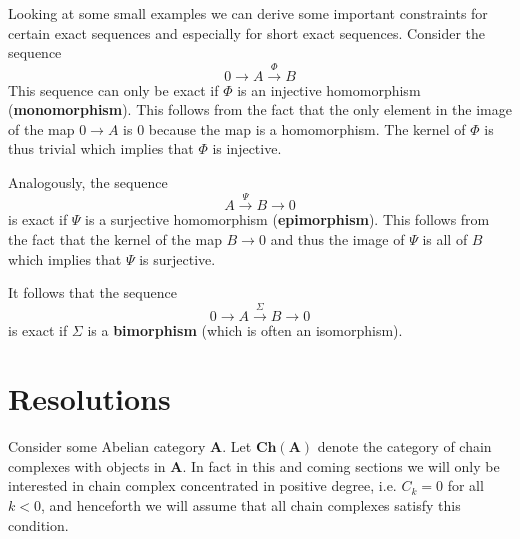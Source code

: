 	
	\begin{property}
		Looking at some small examples we can derive some important constraints for certain exact sequences and especially for short exact sequences. Consider the sequence
		\[
			0\rightarrow A\xrightarrow{\Phi} B
		\]
		This sequence can only be exact if $\Phi$ is an injective homomorphism (\textbf{monomorphism}). This follows from the fact that the only element in the image of the map $0\rightarrow A$ is 0 because the map is a homomorphism. The kernel of $\Phi$ is thus trivial which implies that $\Phi$ is injective.
		
		Analogously, the sequence
		\[
			A\xrightarrow{\Psi}B\rightarrow0
		\]
		is exact if $\Psi$ is a surjective homomorphism (\textbf{epimorphism}). This follows from the fact that the kernel of the map $B\rightarrow0$ and thus the image of $\Psi$ is all of $B$ which implies that $\Psi$ is surjective.
		
		It follows that the sequence
		\[
			0\rightarrow A\xrightarrow{\Sigma}B\rightarrow0
		\]
		is exact if $\Sigma$ is a \textbf{bimorphism} (which is often an isomorphism).
	\end{property}

\section{Resolutions}

	Consider some Abelian category $\textbf{A}$. Let $\textbf{Ch}(\textbf{A})$ denote the category of chain complexes with objects in $\textbf{A}$. In fact in this and coming sections we will only be interested in chain complex concentrated in positive degree, i.e. $C_k=0$ for all $k<0$, and henceforth we will assume that all chain complexes satisfy this condition.
	
	
